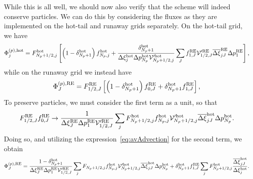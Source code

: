 \documentclass{notes}
\newcommand{\Vp}{\mathcal{V}'}
\begin{document}
    While this is all well, we should now also verify that the scheme will
    indeed conserve particles. We can do this by considering the fluxes as they
    are implemented on the hot-tail and runaway grids separately. On the
    hot-tail grid, we have
    \begin{equation}\label{eq:PhiPhot2}
        \Phi^{(p),{\rm hot}}_j = F^{\rm hot}_{N_p+1/2,j} \left[
            \left( 1-\delta^{\rm hot}_{N_p+1}\right)f^{\rm hot}_{N_p,j} +
            \frac{\delta^{\rm hot}_{N_p+1}}{\Delta\xi^{\rm hot}_j\Delta p_{N_p}^{\rm hot}\Vp^{\rm hot}_{N_p+1/2,j}} \sum_J
                f_{1,J}^{\rm RE} \Vp^{\rm RE}_{1/2,J} \overline{\Delta\xi}_{jJ}^{\rm RE}\Delta p_1^{\rm RE}
        \right],
    \end{equation}
    while on the runaway grid we instead have
    \begin{equation}\label{eq:PhiPRE}
        \begin{aligned}
            \Phi^{(p),{\rm RE}}_J &= F^{\rm RE}_{1/2,J} \left[
                \left( 1-\delta^{\rm hot}_{N_p+1} \right)f^{\rm RE}_{0,J} +
                \delta^{\rm hot}_{N_p+1} f^{\rm RE}_{1,J}
            \right],\\
        \end{aligned}
    \end{equation}
    To preserve particles, we must consider the first term as a unit, so that
    \begin{equation}
        F_{1/2,J}^{\rm RE} f_{0,J}^{\rm RE} \to
        \frac{1}{\Delta\xi^{\rm RE}_J\Delta p_1^{\rm RE}\Vp^{\rm RE}_{1/2,J}} \sum_j
            F_{N_p+1/2,j}^{\rm hot}f_{N_p,j}^{\rm hot}
            \Vp^{\rm hot}_{N_p+1/2,j} \overline{\Delta\xi}_{jJ}^{\rm hot}\Delta p_{N_p}^{\rm hot}.
    \end{equation}
    Doing so, and utilizing the expression~\eqref{eq:avAdvection} for the second
    term, we obtain
    \begin{equation}
        \Phi^{(p),{\rm RE}}_J =
            \frac{1-\delta^{\rm hot}_{N_p+1}}{\Delta\xi^{\rm RE}_J\Delta p_1^{\rm RE}\Vp^{\rm RE}_{1/2,J}} \sum_j
                F_{N_p+1/2,j}f_{N_p,j}^{\rm hot}
                \Vp^{\rm hot}_{N_p+1/2,j} \overline{\Delta\xi}_{jJ}^{\rm hot}\Delta p_{N_p}^{\rm hot} +
            \delta^{\rm hot}_{N_p+1} f^{\rm RE}_{1,J}
            \sum_j F^{\rm hot}_{N_p+1/2,j}
            \frac{\overline{\Delta\xi}^{\rm hot}_{jJ}}{\Delta\xi_j^{\rm hot}}.
    \end{equation}
\end{document}
